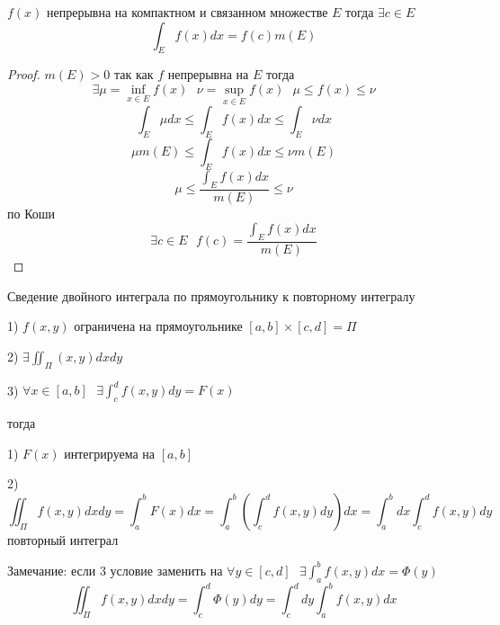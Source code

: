 \begin{theorem}[о среднем]
  $f(x)$ непрерывна на компактном и связанном множестве $E$ тогда
  $\exists c \in E$
  $$
  \int_E f(x)dx = f(c) m(E)
  $$
\end{theorem}

\begin{proof}
  $m(E) > 0$ так как $f$ непрерывна на $E$ тогда
  $$
  \exists \mu = \inf \limits_{x \in E} f(x) ~~~ \nu = \sup \limits_{x \in E}
  f(x) ~~~ \mu \le f(x) \le \nu
  $$
  $$
  \int_E \mu dx \le \int_E f(x) dx \le \int_E \nu dx
  $$
  $$
  \mu m(E) \le \int_E f(x) dx \le \nu m(E)
  $$
  $$
  \mu \le \frac{\int_E f(x)dx}{m(E)} \le \nu
  $$
  по Коши
  $$
  \exists c \in E ~~~ f(c) = \frac{\int_E f(x)dx}{m(E)}
  $$
\end{proof}

\begin{title}[\Large]
  Сведение двойного интеграла по прямоугольнику к повторному интегралу
\end{title}

\begin{theorem}
  1) $f(x, y)$ ограничена на прямоугольнике $[a,b] \times [c,d] = \Pi$

  2) $\exists \iint_{\Pi} (x,y)dxdy$

  3) $\forall x \in [a,b] ~~~ \exists \int_c^d f(x,y) dy = F(x)$

  тогда

  1) $F(x)$ интегрируема на $[a,b]$

  2)
  $$
  \iint_{\Pi} f(x, y) dxdy = \int_a^b F(x)dx = \int_a^b \left( \int_c^d f(x,y)
  dy \right)dx = \int_a^b dx \int_c^d f(x,y) dy
  $$
  повторный интеграл

  Замечание: если 3 условие заменить на
  $\forall y \in [c,d] ~~~ \exists \int_a^b f(x,y) dx = \Phi(y)$
  $$
  \iint_{\Pi} f(x, y) dxdy = \int_c^d \Phi(y)dy = \int_c^d dy \int_a^b f(x,y) dx
  $$
\end{theorem}

